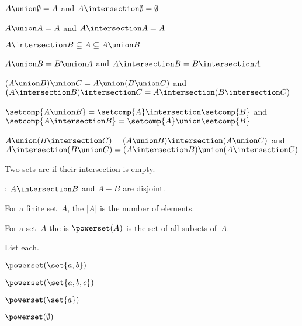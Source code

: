 \documentclass{ibl}
\begin{document}
\begin{ex}
\begin{exes}
\item $A\union\emptyset=A$ and $A\intersection\emptyset=\emptyset$
\item {} $A\union A=A$ and $A\intersection A=A$  
\item $A\intersection B\subseteq A\subseteq A\union B$  
\item {}
   $A\union B=B\union A$ and $A\intersection B=B\intersection A$
\item {} 
  $(A\union B)\union C=A\union (B\union C)$
  and $(A\intersection B)\intersection C=A\intersection (B\intersection C)$
\item 
  $\setcomp{A\union B}=\setcomp{A}\intersection\setcomp{B}$
  and 
  $\setcomp{A\intersection B}=\setcomp{A}\union\setcomp{B}$
\item {} 
$A\union (B\intersection C)=(A\union B)\intersection (A\union C)$
 and $A\intersection (B\union C)=(A\intersection B)\union (A\intersection C)$
\end{exes}
\end{ex}

\begin{df}
Two sets are  if their intersection is empty.  
\end{df}

\begin{ex}
\pord: $A\intersection B$ and $A-B$ are disjoint.  
\end{ex}

\begin{df}
For a finite set~$A$, the  $|A|$ is the number of elements.
\end{df}


\begin{df}
For a set~$A$ the  is $\powerset(A)$ is the set of all
subsets of~$A$.
\end{df}

\begin{ex} List each.
\begin{exes}
\item $\powerset(\set{a,b})$   
\item $\powerset(\set{a,b,c})$   
\item $\powerset(\set{a})$   
\item $\powerset(\emptyset)$   
\end{exes}
\end{ex}
\end{document}

